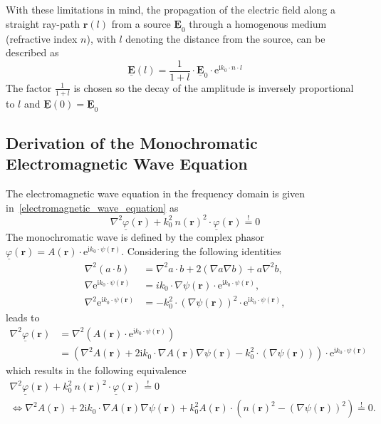With these limitations in mind, the propagation of the electric field along a straight ray-path \(\bm{r}(l)\) from a source \(\underline{\bm{E}}_0\) through a homogenous medium (refractive index \(n\)), with \(l\) denoting the distance from the source, can be described as
\begin{equation} \label{eq:field-along-ray-path}
    \underline{\bm{E}}(l) = \frac{1}{1 + l} \cdot \underline{\bm{E}}_0 \cdot \mathrm{e}^{\mathrm{i} k_0 \cdot n \cdot l}
\end{equation}
The factor \(\frac{1}{1 + l}\) is chosen so the decay of the amplitude is inversely proportional to \(l\) and  \(\underline{\bm{E}}(0) = \underline{\bm{E}}_0 \)




\subsection{Derivation of the Monochromatic Electromagnetic Wave Equation}\label{derivation}
The electromagnetic wave equation in the frequency domain is given in~\eqref{electromagnetic_wave_equation} as
\begin{equation}
    \nabla^2 \underline{\varphi}(\bm{r}) + k_0^2\ n{(\bm{r})}^2 \cdot \underline{\varphi}(\bm{r}) \stackrel{!}{=} 0
\end{equation}
The monochromatic wave is defined by the complex phasor \(\underline{\varphi}(\bm{r}) = A(\bm{r}) \cdot \mathrm{e}^{\mathrm{i}k_0 \cdot \psi(\bm{r})}\).
Considering the following identities
\begin{align}
    \nabla^2 (a \cdot b) &= \nabla^2 a \cdot b + 2 (\nabla a \nabla b) + a \nabla^2 b, \\
    \nabla \mathrm{e}^{\mathrm{i} k_0 \cdot \psi(\bm{r})} &= i k_0 \cdot \nabla \psi(\bm{r}) \cdot \mathrm{e}^{\mathrm{i} k_0 \cdot \psi(\bm{r})}, \\
    \nabla^2 \mathrm{e}^{\mathrm{i} k_0 \cdot \psi(\bm{r})} &= - k_0^2 \cdot {(\nabla \psi(\bm{r}))}^2 \cdot \mathrm{e}^{\mathrm{i} k_0 \cdot \psi(\bm{r})},
\end{align}
leads to
\begin{align}
    \nabla^2 \underline{\varphi}(\bm{r}) &=\nabla^2 (A(\bm{r}) \cdot \mathrm{e}^{\mathrm{i}k_0 \cdot \psi(\bm{r})}) \nonumber \\
                                        &= (\nabla^2 A(\bm{r}) + 2\mathrm{i}k_0 \cdot \nabla A(\bm{r}) \nabla \psi(\bm{r}) - k_0^2 \cdot (\nabla \psi(\bm{r}))) \cdot \mathrm{e}^{\mathrm{i}k_0 \cdot \psi(\bm{r})}
\end{align}
which results in the following equivalence
\begin{gather}
    \nabla^2 \underline{\varphi}(\bm{r}) + k_0^2\ n{(\bm{r})}^2 \cdot \underline{\varphi}(\bm{r}) \stackrel{!}{=} 0 \\
    \Leftrightarrow \nabla^2 A(\bm{r}) + 2\mathrm{i}k_0 \cdot \nabla A(\bm{r}) \nabla \psi(\bm{r}) + k_0^2 A(\bm{r}) \cdot ({n(\bm{r})}^2 - {(\nabla \psi(\bm{r}))}^2) \stackrel{!}{=} 0.
\end{gather}